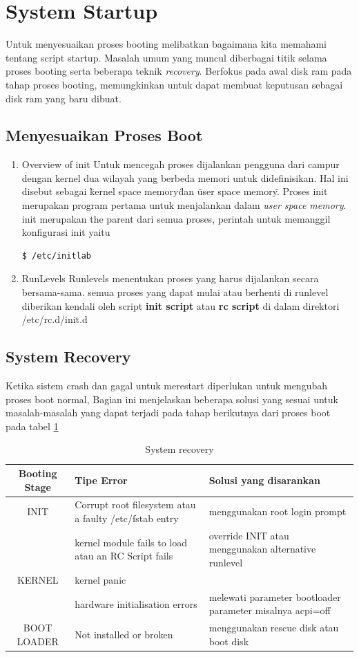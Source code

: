 \section{System Startup}
Untuk menyesuaikan proses booting melibatkan bagaimana kita memahami tentang script startup. Masalah umum yang muncul diberbagai titik selama proses booting serta beberapa teknik \textit{recovery}. Berfokus pada awal disk ram pada tahap proses booting, memungkinkan untuk dapat membuat keputusan sebagai disk ram yang baru dibuat.
\subsection{Menyesuaikan Proses Boot}
\begin{enumerate}
\item Overview of init
Untuk mencegah proses dijalankan pengguna dari campur dengan kernel dua wilayah yang berbeda memori untuk didefinisikan. Hal ini disebut sebagai \" kernel space memory\" dan \"user space memory\". Proses init merupakan program pertama untuk menjalankan dalam \textit{user space memory}.
 init merupakan the parent dari semua proses, perintah untuk memanggil konfigurasi init yaitu 
\begin{verbatim}
$ /etc/initlab
\end{verbatim}
\item RunLevels
Runlevels menentukan proses yang harus dijalankan secara bersama-sama.  semua proses yang dapat mulai atau berhenti di runlevel diberikan kendali oleh script \textbf{init script} atau \textbf{rc script} di dalam direktori /etc/rc.d/init.d
\end{enumerate}

\subsection{System Recovery}
Ketika sistem crash dan gagal untuk merestart diperlukan untuk mengubah proses boot normal, Bagian ini menjelaskan beberapa solusi yang sesuai untuk masalah-masalah yang dapat terjadi pada tahap berikutnya dari proses boot pada tabel \ref{recovery}
\begin{table}[h]
		\caption{System recovery}
		\label{recovery}
			\begin{tabular}{|c|l|l|}
			\hline
			\textbf{Booting Stage}&\textbf{Tipe Error}&\textbf{Solusi yang disarankan}\\
			\hline
			INIT&Corrupt root filesystem atau a faulty /etc/fstab entry&menggunakan root login prompt\\
				&kernel module fails to load atau an RC Script fails&override INIT atau menggunakan alternative runlevel\\
			\hline
			KERNEL&kernel panic& 	\\
				&hardware initialisation errors&melewati parameter bootloader parameter misalnya acpi=off\\
			\hline
			BOOT LOADER&Not installed or broken&menggunakan rescue disk atau boot disk\\
			\hline
\end{tabular}
\end{table}